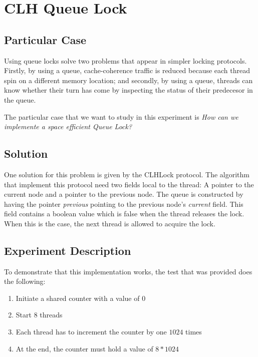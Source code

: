 \section{\textbf{CLH Queue Lock}}
\subsection{Particular Case}
\par
Using queue locks solve two problems that appear in simpler locking protocols.
Firstly, by using a queue, cache-coherence traffic is reduced because each
thread spin on a different memory location; and secondly, by using a queue,
threads can know whether their turn has come by inspecting the status of their
predecesor in the queue.
\par
The particular case that we want to study in this experiment is \textit{How can
we implemente a space efficient Queue Lock?}
\par
\subsection{Solution}
\par
One solution for this problem is given by the CLHLock protocol. The algorithm
that implement this protocol need two fields local to the thread: A pointer to
the current node and a pointer to the previous node. The queue is constructed by
having the pointer \textit{previous} pointing to the previous node's
\textit{current} field. This field contains a boolean value which is false when
the thread releases the lock. When this is the case, the next thread is allowed
to acquire the lock. 
\par
\subsection{Experiment Description}
\par
To demonstrate that this implementation works, the test that was provided does
the following:
\begin{enumerate}
\item Initiate a shared counter with a value of $0$
\item Start $8$ threads
\item Each thread has to increment the counter by one $1024$ times
\item At the end, the counter must hold a value of $8*1024$
\end{enumerate}
\par
